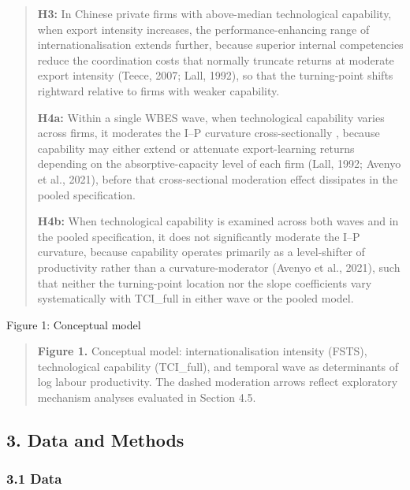 \documentclass[
  12pt,a4paper]{article}
\begin{document}
\begin{quote}
\textbf{H3:} In Chinese private firms with above-median technological
capability, when export intensity increases, the performance-enhancing
range of internationalisation extends further, because superior internal
competencies reduce the coordination costs that normally truncate
returns at moderate export intensity (Teece, 2007; Lall, 1992), so that
the turning-point shifts rightward relative to firms with weaker
capability.

\textbf{H4a:} Within a single WBES wave, when technological capability
varies across firms, it moderates the I--P curvature cross-sectionally ,
because capability may either extend or attenuate export-learning
returns depending on the absorptive-capacity level of each firm (Lall,
1992; Avenyo et al., 2021), before that cross-sectional moderation
effect dissipates in the pooled specification.

\textbf{H4b:} When technological capability is examined across both
waves and in the pooled specification, it does not significantly
moderate the I--P curvature, because capability operates primarily as a
level-shifter of productivity rather than a curvature-moderator (Avenyo
et al., 2021), such that neither the turning-point location nor the
slope coefficients vary systematically with TCI\_full in either wave or
the pooled model.
\end{quote}

Figure 1: Conceptual model

\begin{quote}
\textbf{Figure 1.} Conceptual model: internationalisation intensity
(FSTS), technological capability (TCI\_full), and temporal wave as
determinants of log labour productivity. The dashed moderation arrows
reflect exploratory mechanism analyses evaluated in Section 4.5.
\end{quote}

\hypertarget{data-and-methods}{%
\subsection{3. Data and Methods}\label{data-and-methods}}

\hypertarget{data}{%
\subsubsection{3.1 Data}\label{data}}
\end{document}
